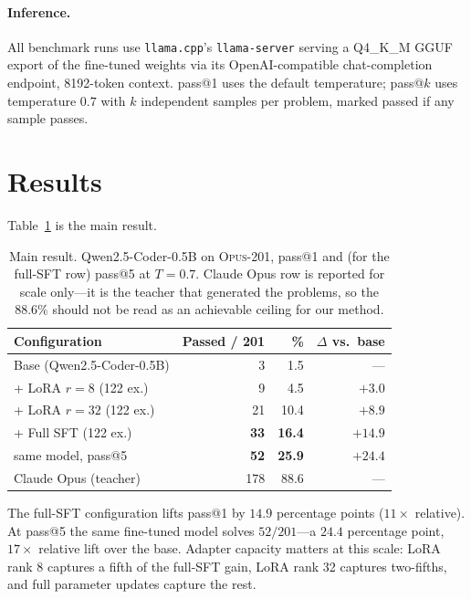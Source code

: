 \documentclass[11pt,a4paper]{article}
\begin{document}
\paragraph{Inference.}
All benchmark runs use \texttt{llama.cpp}'s \texttt{llama-server} serving a Q4\_K\_M GGUF export of the fine-tuned weights via its OpenAI-compatible chat-completion endpoint, 8192-token context. pass@1 uses the default temperature; pass@$k$ uses temperature $0.7$ with $k$ independent samples per problem, marked passed if any sample passes.

\section{Results}
\label{sec:results}

Table~\ref{tab:main} is the main result.

\begin{table}[h]
\centering
\small
\caption{Main result. Qwen2.5-Coder-0.5B on \textsc{Opus-201}, pass@1 and (for the full-SFT row) pass@5 at $T=0.7$. Claude Opus row is reported for scale only---it is the teacher that generated the problems, so the $88.6\%$ should not be read as an achievable ceiling for our method.}
\label{tab:main}
\begin{tabular}{lrrr}
\toprule
Configuration                 & Passed / 201 & \% & $\Delta$ vs.\ base \\
\midrule
Base (Qwen2.5-Coder-0.5B)     & 3   & 1.5  & ---         \\
+ LoRA $r{=}8$   (122 ex.)    & 9   & 4.5  & $+3.0$ \\
+ LoRA $r{=}32$  (122 ex.)    & 21  & 10.4 & $+8.9$ \\
+ Full SFT       (122 ex.)    & \textbf{33}  & \textbf{16.4} & $\mathbf{+14.9}$ \\
\quad same model, pass@5      & \textbf{52}  & \textbf{25.9} & $\mathbf{+24.4}$ \\
\midrule
Claude Opus (teacher)         & 178 & 88.6 & ---         \\
\bottomrule
\end{tabular}
\end{table}

The full-SFT configuration lifts pass@1 by $14.9$ percentage points ($11\times$ relative). At pass@5 the same fine-tuned model solves $52/201$---a $24.4$ percentage point, $17\times$ relative lift over the base. Adapter capacity matters at this scale: LoRA rank 8 captures a fifth of the full-SFT gain, LoRA rank 32 captures two-fifths, and full parameter updates capture the rest.
\end{document}

